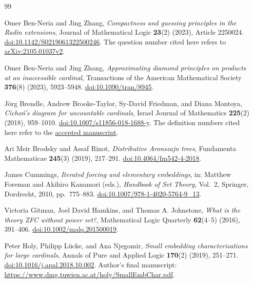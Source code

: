 \documentclass[11pt,a4paper]{amsart}
\theoremstyle{definition}
\theoremstyle{remark}
\begin{document}
\begin{thebibliography}{99}
\raggedright

Omer Ben-Neria and Jing Zhang,
\emph{Compactness and guessing principles in the Radin extensions},
Journal of Mathematical Logic \textbf{23}(2) (2023), Article 2250024.
\href{https://doi.org/10.1142/S0219061322500246}
     {doi:10.1142/S0219061322500246}.
The question number cited here refers to
\href{https://arxiv.org/abs/2105.01037v2}{arXiv:2105.01037v2}.

Omer Ben-Neria and Jing Zhang,
\emph{Approximating diamond principles on products at an
inaccessible cardinal},
Transactions of the American Mathematical Society
\textbf{376}(8) (2023), 5923--5948.
\href{https://doi.org/10.1090/tran/8945}
     {doi:10.1090/tran/8945}.

J\"org Brendle, Andrew Brooke-Taylor, Sy-David Friedman,
and Diana Montoya,
\emph{Cicho\'n's diagram for uncountable cardinals},
Israel Journal of Mathematics \textbf{225}(2) (2018), 959--1010.
\href{https://doi.org/10.1007/s11856-018-1688-y}
     {doi:10.1007/s11856-018-1688-y}.
The definition numbers cited here refer to the
\href{https://eprints.whiterose.ac.uk/id/eprint/118463/1/cichon-large(revised).pdf}
     {accepted manuscript}.

Ari Meir Brodsky and Assaf Rinot,
\emph{Distributive Aronszajn trees},
Fundamenta Mathematicae \textbf{245}(3) (2019), 217--291.
\href{https://doi.org/10.4064/fm542-4-2018}
     {doi:10.4064/fm542-4-2018}.

James Cummings,
\emph{Iterated forcing and elementary embeddings},
in: Matthew Foreman and Akihiro Kanamori (eds.),
\emph{Handbook of Set Theory}, Vol.~2,
Springer, Dordrecht, 2010, pp.~775--883.
\href{https://doi.org/10.1007/978-1-4020-5764-9_13}
     {doi:10.1007/978-1-4020-5764-9\_13}.

Victoria Gitman, Joel David Hamkins, and Thomas A. Johnstone,
\emph{What is the theory ZFC without power set?},
Mathematical Logic Quarterly \textbf{62}(4--5) (2016), 391--406.
\href{https://doi.org/10.1002/malq.201500019}
     {doi:10.1002/malq.201500019}.

Peter Holy, Philipp L\"ucke, and Ana Njegomir,
\emph{Small embedding characterizations for large cardinals},
Annals of Pure and Applied Logic \textbf{170}(2) (2019), 251--271.
\href{https://doi.org/10.1016/j.apal.2018.10.002}
     {doi:10.1016/j.apal.2018.10.002}.
Author's final manuscript:
\url{https://www.dmg.tuwien.ac.at/holy/SmallEmbChar.pdf}.


\end{thebibliography}
\end{document}
